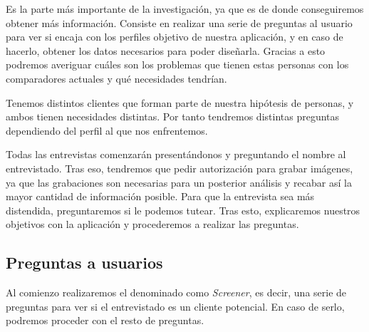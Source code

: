 Es la parte más importante de la investigación, ya que es de donde conseguiremos obtener más información. Consiste en realizar una serie de preguntas al usuario para
ver si encaja con los perfiles objetivo de nuestra aplicación, y en caso de hacerlo, obtener los datos necesarios para poder diseñarla. Gracias a esto podremos averiguar
cuáles son los problemas que tienen estas personas con los comparadores actuales y qué necesidades tendrían.

Tenemos distintos clientes que forman parte de nuestra hipótesis de personas, y ambos tienen necesidades distintas. Por tanto tendremos distintas preguntas
dependiendo del perfil al que nos enfrentemos.

Todas las entrevistas comenzarán presentándonos y preguntando el nombre al entrevistado. Tras eso, tendremos que pedir autorización para grabar imágenes, ya que las
grabaciones son necesarias para un posterior análisis y recabar así la mayor cantidad de información posible. Para que la entrevista sea más distendida, preguntaremos
si le podemos tutear. Tras esto, explicaremos nuestros objetivos con la aplicación y procederemos a realizar las preguntas.

\subsection{Preguntas a usuarios}

Al comienzo realizaremos el denominado como \textit{Screener}, es decir, una serie de preguntas para ver si el entrevistado es un cliente potencial. En caso de serlo,
podremos proceder con el resto de preguntas.

